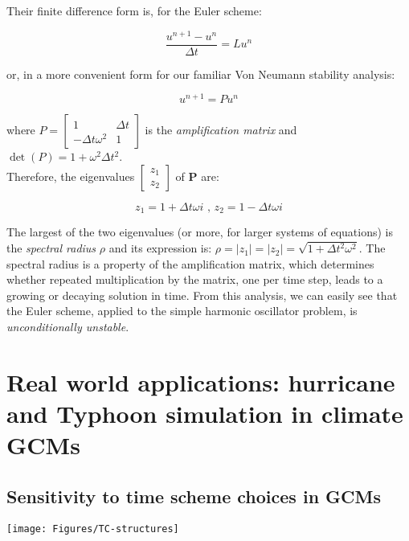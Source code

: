 Their finite difference form is, for the Euler scheme:

\begin{equation}
	\frac{u^{n+1} -u^n}{\Delta t} = L u^n 
\end{equation}

or, in a more convenient form for our familiar Von Neumann stability analysis:

\begin{equation}
u^{n+1}=P u^n 
\end{equation}

where $P=\left[\begin{array}{cc}
	1 & \Delta t \\
	-\Delta t \omega^2 & 1
\end{array}\right]$ is the \emph{amplification matrix} and $\operatorname{det}(P)=1+\omega^2 \Delta t^2 $.\\

Therefore, the eigenvalues $\left[\begin{array}{l}
	z_1 \\
	z_2
\end{array}\right]$ of $\mathbf{P}$ are:

\begin{equation}
z_1=1+\Delta t \omega i \text{ , } z_2=1-\Delta t \omega i
\end{equation}

The largest of the two eigenvalues (or more, for larger systems of equations) is the \emph{spectral radius} $\rho$ and its expression is: $\rho=\left|z_1\right|=\left|z_2\right|=\sqrt{1+\Delta t^2 \omega^2}$. The spectral radius is a property of the amplification matrix, which determines whether repeated multiplication by the matrix, one per time step, leads to a growing or decaying solution in time. From this analysis, we can easily see that the Euler scheme, applied to the simple harmonic oscillator problem, is \emph{unconditionally unstable}. 


\section{Real world applications: hurricane and Typhoon simulation in climate GCMs}

\subsection{Sensitivity to time scheme choices in GCMs}

\begin{center}	
	\texttt{[image: Figures/TC-structures]}
\end{center}

